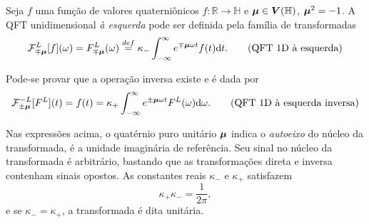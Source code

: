 Seja $f$ uma fun\c c\~ao de valores quaterni\^onicos $f: \mathbb{R} \rightarrow \mathbb{H}$ e $\boldsymbol{\mu} \in \boldsymbol{V}(\mathbb{H})$, $\boldsymbol{\mu}^2 = -1$. A QFT unidimensional \emph{\`a esquerda} pode ser definida pela fam\'ilia de transformadas
\begin{equation}
\mathcal{F}^L_{\mp \boldsymbol{\mu}}[f](\omega) = 
F^L_{\mp \boldsymbol{\mu}}(\omega) \overset{def}{=}
\kappa_{-} \int_{-\infty}^{\infty} e^{\mp \boldsymbol{\mu} \omega t} f(t) \mathrm{d}t.
\tag{QFT 1D \`a esquerda}
\end{equation}

Pode-se provar que a opera\c c\~ao inversa existe e \'e dada por
\begin{equation}
\mathcal{F}^{-L}_{\pm \boldsymbol{\mu}}[F^L](t) = 
f(t) =
\kappa_{+} \int_{-\infty}^{\infty} e^{\pm \boldsymbol{\mu} \omega t} F^L(\omega) \mathrm{d}\omega.
\tag{QFT 1D \`a esquerda inversa}
\end{equation}

Nas express\~oes acima, o quat\'ernio puro unit\'ario $\boldsymbol{\mu}$ indica o \emph{autoeixo} do n\'ucleo da transformada, \'e a unidade imagin\'aria de refer\^encia. Seu sinal no n\'ucleo da transformada \'e arbitr\'ario, bastando que as transforma\c c\~oes direta e inversa contenham sinais opostos. As constantes reais $\kappa_{-}$ e $\kappa_{+}$ satisfazem
\begin{equation}
\kappa_{+} \kappa_{-} = \frac{1}{2\pi},
\end{equation}
\noindent e se $\kappa_{-} = \kappa_{+}$, a transformada \'e dita unit\'aria.

%
%
%
%
%
%


